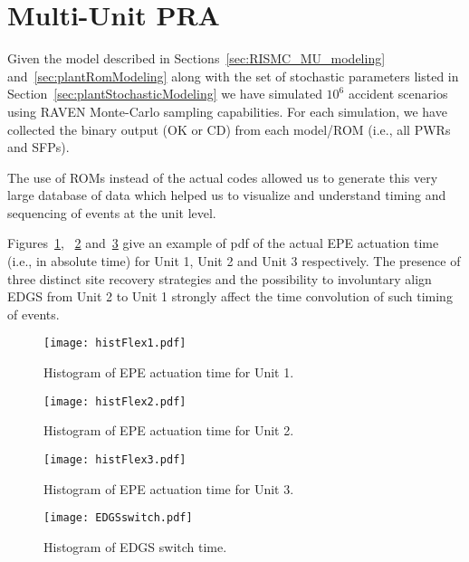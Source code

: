 \section{Multi-Unit PRA}
\label{sec:multiUnitPRA}

Given the model described in Sections~\ref{sec:RISMC_MU_modeling} and~\ref{sec:plantRomModeling} 
along with the set of stochastic parameters listed in Section~\ref{sec:plantStochasticModeling} we have 
simulated $10^6$ accident scenarios using RAVEN Monte-Carlo sampling
capabilities. For each simulation, we have collected the binary output (OK or CD) from 
each model/ROM (i.e., all PWRs and SFPs).

The use of ROMs instead of the actual codes allowed us to generate this very large 
database of data which helped us to visualize and understand timing and sequencing of events at 
the unit level.

Figures~\ref{fig:histFlex1}, ~\ref{fig:histFlex2} and~\ref{fig:histFlex3} give an example of pdf
of the actual EPE actuation time (i.e., in absolute time) for Unit 1, Unit 2 and Unit 3 respectively. 
The presence of three distinct site recovery strategies and the possibility to involuntary align
EDGS from Unit 2 to Unit 1 strongly affect the time convolution of such timing of events. 

\begin{figure}
    \centering
    \texttt{[image: histFlex1.pdf]}
    \caption{Histogram of EPE actuation time for Unit 1.}
    \label{fig:histFlex1}
\end{figure}

\begin{figure}
    \centering
    \texttt{[image: histFlex2.pdf]}
    \caption{Histogram of EPE actuation time for Unit 2.}
    \label{fig:histFlex2}
\end{figure}

\begin{figure}
    \centering
    \texttt{[image: histFlex3.pdf]}
    \caption{Histogram of EPE actuation time for Unit 3.}
    \label{fig:histFlex3}
\end{figure}

\begin{figure}
    \centering
    \texttt{[image: EDGSswitch.pdf]}
    \caption{Histogram of EDGS switch time.}
    \label{fig:EDGSswitch}
\end{figure}